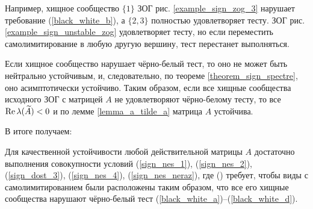         Например, хищное сообщество \(\{1\}\) ЗОГ рис. \ref{example_sign_zog_3} нарушает требование (\ref{black_white_b}), а \(\{ 2, 3 \}\) полностью удовлетворяет тесту. ЗОГ рис. \ref{example_sign_unstable_zog} удовлетворяет тесту, но если переместить самолимитирование в любую другую вершину, тест перестанет выполняться.

        Если хищное сообщество нарушает чёрно-белый тест, то оно не может быть нейтрально устойчивым, и, следовательно, по теореме \ref{theorem_sign_spectre}, оно асимптотически устойчиво. Таким образом, если все хищные сообщества исходного ЗОГ с матрицей \(A\) не удовлетворяют чёрно-белому тесту, то все \(\operatorname{Re} \lambda(\widetilde{A}) < 0\) и по лемме \ref{lemma_a_tilde_a} матрица \(A\) устойчива.

        В итоге получаем:
        \begin{statement} \label{sign_stab_dost}
            Для качественной устойчивости любой действительной матрицы \(A\) достаточно выполнения совокупности условий (\ref{sign_nes_1}), (\ref{sign_nes_2}), (\ref{sign_dost_3}), (\ref{sign_nes_4}), (\ref{sign_nes_neraz}), где () требует, чтобы виды с самолимитированием были расположены таким образом, что все его хищные сообщества нарушают чёрно-белый тест (\ref{black_white_a})--(\ref{black_white_d}).
        \end{statement}